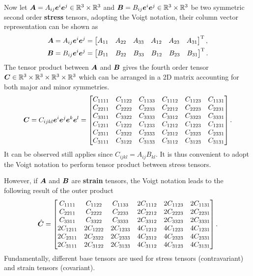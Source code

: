Now let $\bm{A}=A_{ij}\bm{e}^i\bm{e}^j\in\mathbb{R}^3\times\mathbb{R}^3$ and $\bm{B}=B_{ij}\bm{e}^i\bm{e}^j\in\mathbb{R}^3\times\mathbb{R}^3$ be two symmetric second order \textbf{stress} tensors, adopting the Voigt notation, their column vector representation can be shown as
\begin{gather}
\bm{A}=A_{ij}\bm{e}^i\bm{e}^j=\begin{bmatrix}
A_{11}&A_{22}&A_{33}&A_{12}&A_{23}&A_{31}
\end{bmatrix}^{\mathrm{T}},\\
\bm{B}=B_{ij}\bm{e}^i\bm{e}^j=\begin{bmatrix}
B_{11}&B_{22}&B_{33}&B_{12}&B_{23}&B_{31}
\end{bmatrix}^{\mathrm{T}}.
\end{gather}
The tensor product  between $\bm{A}$ and $\bm{B}$ gives the fourth order tensor $\bm{C}\in\mathbb{R}^3\times\mathbb{R}^3\times\mathbb{R}^3\times\mathbb{R}^3$ which can be arranged in a 2D matrix accounting for both major and minor symmetries.
\begin{gather}
\bm{C}=C_{ijkl}\bm{e}^i\bm{e}^j\bm{e}^k\bm{e}^l=\begin{bmatrix}
C_{1111}&C_{1122}&C_{1133}&C_{1112}&C_{1123}&C_{1131}\\
C_{2211}&C_{2222}&C_{2233}&C_{2212}&C_{2223}&C_{2231}\\
C_{3311}&C_{3322}&C_{3333}&C_{3312}&C_{3323}&C_{3331}\\
C_{1211}&C_{1222}&C_{1233}&C_{1212}&C_{1223}&C_{1231}\\
C_{2311}&C_{2322}&C_{2333}&C_{2312}&C_{2323}&C_{2331}\\
C_{3111}&C_{3122}&C_{3133}&C_{3112}&C_{3123}&C_{3131}
\end{bmatrix}.
\end{gather}
It can be observed  still applies since $C_{ijkl}=A_{ij}B_{kl}$. It is thus convenient to adopt the Voigt notation to perform tensor product between stress tensors.

However, if $\bm{A}$ and $\bm{B}$ are \textbf{strain} tensors, the Voigt notation leads to the following result of the outer product
\begin{gather}
\hat{\bm{C}}=\begin{bmatrix}
C_{1111}&C_{1122}&C_{1133}&2C_{1112}&2C_{1123}&2C_{1131}\\
C_{2211}&C_{2222}&C_{2233}&2C_{2212}&2C_{2223}&2C_{2231}\\
C_{3311}&C_{3322}&C_{3333}&2C_{3312}&2C_{3323}&2C_{3331}\\
2C_{1211}&2C_{1222}&2C_{1233}&4C_{1212}&4C_{1223}&4C_{1231}\\
2C_{2311}&2C_{2322}&2C_{2333}&4C_{2312}&4C_{2323}&4C_{2331}\\
2C_{3111}&2C_{3122}&2C_{3133}&4C_{3112}&4C_{3123}&4C_{3131}
\end{bmatrix}.
\end{gather}
Fundamentally, different base tensors are used for stress tensors (contravariant) and strain tensors (covariant).

